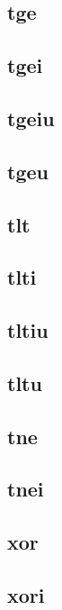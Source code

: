 \subsection*{tge}

\subsection*{tgei}

\subsection*{tgeiu}

\subsection*{tgeu}

\subsection*{tlt}

\subsection*{tlti}

\subsection*{tltiu}

\subsection*{tltu}

\subsection*{tne}

\subsection*{tnei}

\subsection*{xor}

\subsection*{xori}